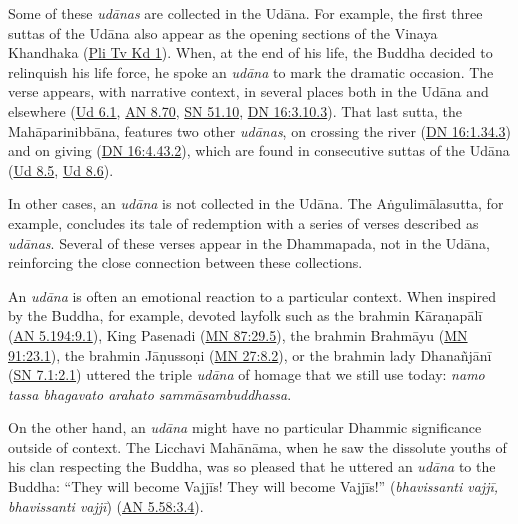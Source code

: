 \documentclass[12pt,openany]{book}%
\begin{document}
Some of these \textit{\textsanskrit{udānas}} are collected in the \textsanskrit{Udāna}. For example, the first three suttas of the \textsanskrit{Udāna} also appear as the opening sections of the Vinaya Khandhaka (\href{https://suttacentral.net/pli-tv-kd1}{Pli Tv Kd 1}). When, at the end of his life, the Buddha decided to relinquish his life force, he spoke an \textit{\textsanskrit{udāna}} to mark the dramatic occasion. The verse appears, with narrative context, in several places both in the \textsanskrit{Udāna} and elsewhere (\href{https://suttacentral.net/ud6.1/en/sujato}{Ud 6.1}, \href{https://suttacentral.net/an8.70/en/sujato}{AN 8.70}, \href{https://suttacentral.net/sn51.10/en/sujato}{SN 51.10}, \href{https://suttacentral.net/dn16/en/sujato\#3.10.3}{DN 16:3.10.3}). That last sutta, the \textsanskrit{Mahāparinibbāna}, features two other \textit{\textsanskrit{udānas}}, on crossing the river (\href{https://suttacentral.net/dn16/en/sujato\#1.34.3}{DN 16:1.34.3}) and on giving (\href{https://suttacentral.net/dn16/en/sujato\#4.43.2}{DN 16:4.43.2}), which are found in consecutive suttas of the \textsanskrit{Udāna} (\href{https://suttacentral.net/ud8.5/en/sujato}{Ud 8.5}, \href{https://suttacentral.net/ud8.6/en/sujato}{Ud 8.6}).

In other cases, an \textit{\textsanskrit{udāna}} is not collected in the \textsanskrit{Udāna}. The \textsanskrit{Aṅgulimālasutta}, for example, concludes its tale of redemption with a series of verses described as \textit{\textsanskrit{udānas}}. Several of these verses appear in the Dhammapada, not in the \textsanskrit{Udāna}, reinforcing the close connection between these collections.

An \textit{\textsanskrit{udāna}} is often an emotional reaction to a particular context. When inspired by the Buddha, for example, devoted layfolk such as the brahmin \textsanskrit{Kāraṇapālī}  (\href{https://suttacentral.net/an5.194/en/sujato\#9.1}{AN 5.194:9.1}), King Pasenadi (\href{https://suttacentral.net/mn87/en/sujato\#29.5}{MN 87:29.5}), the brahmin \textsanskrit{Brahmāyu} (\href{https://suttacentral.net/mn91/en/sujato\#23.1}{MN 91:23.1}), the brahmin \textsanskrit{Jāṇussoṇi} (\href{https://suttacentral.net/mn27/en/sujato\#8.2}{MN 27:8.2}), or the brahmin lady \textsanskrit{Dhanañjānī} (\href{https://suttacentral.net/sn7.1/en/sujato\#2.1}{SN 7.1:2.1}) uttered the triple \textit{\textsanskrit{udāna}} of homage that we still use today: \textit{namo tassa bhagavato arahato \textsanskrit{sammāsambuddhassa}}. 

On the other hand, an \textit{\textsanskrit{udāna}} might have no particular Dhammic significance outside of context. The Licchavi \textsanskrit{Mahānāma}, when he saw the dissolute youths of his clan respecting the Buddha, was so pleased that he uttered an \textit{\textsanskrit{udāna}} to the Buddha: “They will become \textsanskrit{Vajjīs}! They will become \textsanskrit{Vajjīs}!” (\textit{bhavissanti \textsanskrit{vajjī}, bhavissanti \textsanskrit{vajjī}}) (\href{https://suttacentral.net/an5.58/en/sujato\#3.4}{AN 5.58:3.4}).
\end{document}
